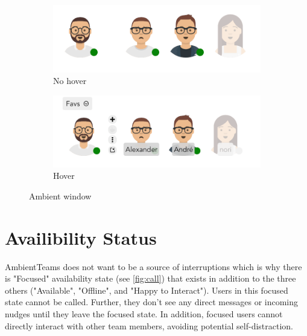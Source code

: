 \begin{figure}[h]
    \centering
    \begin{subfigure}{.5\textwidth}
        \centering
        \includegraphics[width=.8\linewidth]{./images/AT_no_hover.png}
        \caption{No hover }
        \label{fig:at_no_hover}
    \end{subfigure}%
    \begin{subfigure}{.5\textwidth}
        \centering
        \includegraphics[width=.8\linewidth]{./images/AT_hover.png}
        \caption{Hover }
        \label{fig:at_hover}
    \end{subfigure}
    \caption{Ambient window}
\end{figure}

\section{Availibility Status}
AmbientTeams does not want to be a source of interruptions which is why there is "Focused" availability state (see \autoref{fig:call}) that exists in addition to the three others ("Available", "Offline", and "Happy to Interact"). Users in this focused state cannot be called. Further, they don't see any direct messages or incoming nudges until they leave the focused state. In addition, focused users cannot directly interact with other team members, avoiding potential self-distraction.

